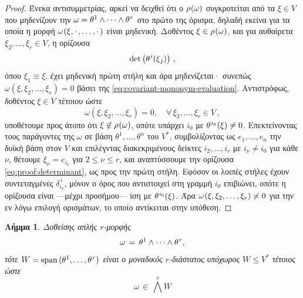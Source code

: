 \documentclass[11pt,a4paper,twoside,openright]{book}
\newtheorem{lemma}{Λήμμα}[section]
\begin{document}
\begin{proof}
Ένεκα αντισυμμετρίας,
αρκεί να δειχθεί ότι ο $\rho\hspace{.5pt}(\omega)$ συγκροτείται από τα
$\xi \in V$ που μηδενίζουν την $\omega = \theta^1 \wedge \dots \wedge \theta^{\hspace{.5pt}r}$ στο πρώτο της όρισμα,
δηλαδή εκείνα για τα οποία η μορφή
$\omega\hspace{.5pt}(\xi, \cdot\,, \dots, \cdot\,)$ είναι μηδενική.
Δοθέντος $\xi \in \rho\hspace{.5pt}(\omega)$,
και για αυθαίρετα
$\xi_2, \dots, \xi_r \in V$, η ορίζουσα
\begin{equation}\label{eq:proof:determinant}
\det
\left(
	\theta^{\hspace{.5pt}i}(\xi_{\hspace{.5pt}j})
\right)\,,
\end{equation}
όπου $\xi_1 \equiv \xi$,
έχει μηδενική πρώτη στήλη και άρα μηδενίζεται· συνεπώς
$\omega(\xi, \xi_2, \dots, \xi_r) = 0$
βάσει της \eqref{eq:covariant-mononym-evaluation}.
Αντιστρόφως, δοθέντος $\xi \in V$ τέτοιου ώστε
\begin{equation*}
\omega(\xi, \xi_2, \dots, \xi_r) = 0,
\quad
\forall\,\xi_2, \dots, \xi_r \in V\,,
\end{equation*}
υποθέτουμε προς άτοπο ότι $\xi \not \in \rho\hspace{.5pt}(\omega)$,
οπότε υπάρχει $i_0$ με $\theta^{\hspace{.5pt}i_0}(\xi) \neq 0$.
Επεκτείνοντας τους παράγοντες της $\omega$
σε βάση $\theta^1, \dots, \theta^n$ του $V^*$,
συμβολίζοντας ως $e_1, \dots, e_n$ την δυϊκή βάση στον $V$
και επιλέγντας διακεκριμένους δείκτες
$i_2, \dots, i_r$ με $i_\nu \neq i_0$ για κάθε $\nu$,
θέτουμε $\xi_\nu = e_{i_\nu}$ για $2 \le \nu \le r$,
και αναπτύσσουμε την ορίζουσα
\eqref{eq:proof:determinant}, ως προς την πρώτη στήλη.
Εφόσον οι λοιπές στήλες έχουν συντεταγμένες $\delta^{\,i}_{i_\nu}$, μόνον ο όρος που αντιστοιχεί στη γραμμή $i_0$ επιβιώνει,
οπότε η ορίζουσα είναι ---μέχρι προσήμου---
ίση με $\theta^{\hspace{.5pt}i_0}(\xi)$.
Άρα $\omega\hspace{.5pt}(\xi, \xi_2, \dots, \xi_r) \neq 0$
για την εν λόγω επιλογή ορισμάτων, το οποίο αντίκειται στην υπόθεση.
\end{proof}
\begin{lemma}%
	\label{lemma:simple-form-subspace}
Δοθείσης απλής $r$-μορφής
\begin{equation*}
\omega \,=\,
\theta^1 \wedge \cdots \wedge \theta^{\hspace{.5pt}r},
\end{equation*}
τότε $W = \operatorname{span}\,(\theta^1, \dots, \theta^{\hspace{.5pt}r})$ είναι ο μοναδικός $r$-διάστατος υπόχωρος $W \le V^*$ τέτοιος ώστε
\begin{equation}
\omega \,\in\, \bigwedge^r W
\end{equation}
\end{lemma}
\end{document}
